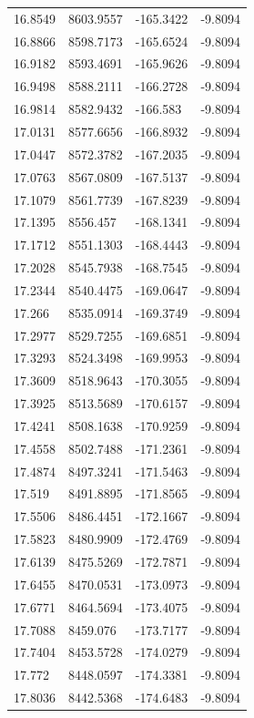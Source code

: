 \begin{table}[H]
\begin{tabular}{llll}
16.8549 & 8603.9557 & -165.3422 & -9.8094 \\
16.8866 & 8598.7173 & -165.6524 & -9.8094 \\
16.9182 & 8593.4691 & -165.9626 & -9.8094 \\
16.9498 & 8588.2111 & -166.2728 & -9.8094 \\
16.9814 & 8582.9432 & -166.583 & -9.8094 \\
17.0131 & 8577.6656 & -166.8932 & -9.8094 \\
17.0447 & 8572.3782 & -167.2035 & -9.8094 \\
17.0763 & 8567.0809 & -167.5137 & -9.8094 \\
17.1079 & 8561.7739 & -167.8239 & -9.8094 \\
17.1395 & 8556.457 & -168.1341 & -9.8094 \\
17.1712 & 8551.1303 & -168.4443 & -9.8094 \\
17.2028 & 8545.7938 & -168.7545 & -9.8094 \\
17.2344 & 8540.4475 & -169.0647 & -9.8094 \\
17.266 & 8535.0914 & -169.3749 & -9.8094 \\
17.2977 & 8529.7255 & -169.6851 & -9.8094 \\
17.3293 & 8524.3498 & -169.9953 & -9.8094 \\
17.3609 & 8518.9643 & -170.3055 & -9.8094 \\
17.3925 & 8513.5689 & -170.6157 & -9.8094 \\
17.4241 & 8508.1638 & -170.9259 & -9.8094 \\
17.4558 & 8502.7488 & -171.2361 & -9.8094 \\
17.4874 & 8497.3241 & -171.5463 & -9.8094 \\
17.519 & 8491.8895 & -171.8565 & -9.8094 \\
17.5506 & 8486.4451 & -172.1667 & -9.8094 \\
17.5823 & 8480.9909 & -172.4769 & -9.8094 \\
17.6139 & 8475.5269 & -172.7871 & -9.8094 \\
17.6455 & 8470.0531 & -173.0973 & -9.8094 \\
17.6771 & 8464.5694 & -173.4075 & -9.8094 \\
17.7088 & 8459.076 & -173.7177 & -9.8094 \\
17.7404 & 8453.5728 & -174.0279 & -9.8094 \\
17.772 & 8448.0597 & -174.3381 & -9.8094 \\
17.8036 & 8442.5368 & -174.6483 & -9.8094 \\

\end{tabular}
\end{table}
